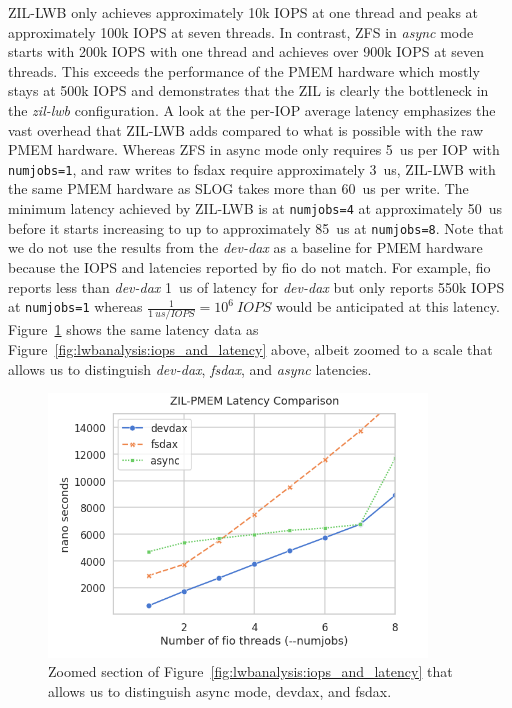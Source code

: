 \documentclass[12pt,a4paper,twoside]{book}
\begin{document}
ZIL-LWB only achieves approximately 10k IOPS at one thread and peaks at approximately 100k IOPS at seven threads.
In contrast, ZFS in \textit{async} mode starts with 200k IOPS with one thread and achieves over 900k IOPS at seven threads.
This exceeds the performance of the PMEM hardware which mostly stays at 500k IOPS and demonstrates that the ZIL is clearly the bottleneck in the \textit{zil-lwb} configuration.
A look at the per-IOP average latency emphasizes the vast overhead that ZIL-LWB adds compared to what is possible with the raw PMEM hardware.
Whereas ZFS in async mode only requires \SI{5}{us} per IOP with \lstinline{numjobs=1}, and raw writes to fsdax require approximately \SI{3}{us}, ZIL-LWB with the same PMEM hardware as SLOG takes more than \SI{60}{us} per write.
The minimum latency achieved by ZIL-LWB is at \lstinline{numjobs=4} at approximately \SI{50}{us} before it starts increasing to up to approximately \SI{85}{us} at \lstinline{numjobs=8}.
Note that we do not use the results from the \textit{dev-dax} as a baseline for PMEM hardware because the IOPS and latencies reported by fio do not match.
For example, fio reports less than \textit{dev-dax} \SI{1}{us} of latency for \textit{dev-dax} but only reports 550k IOPS at \lstinline{numjobs=1} whereas $\frac{1}{\SI{1}{us/IOPS}} = 10^6~\si{IOPS}$ would be anticipated at this latency.
Figure~\ref{fig:lwbanalysis:zoomed_latency} shows the same latency data as Figure~\ref{fig:lwbanalysis:iops_and_latency} above, albeit zoomed to a scale that allows us to distinguish \textit{dev-dax}, \textit{fsdax}, and \textit{async} latencies.

\begin{figure}[H]
    \centering
    \includegraphics[height=7cm]{fig/evaluation/motivating_fio_benchmark__latency_zoomed.png}
    \caption{Zoomed section of Figure~\ref{fig:lwbanalysis:iops_and_latency} that allows us to distinguish async mode, devdax, and fsdax.}
    \label{fig:lwbanalysis:zoomed_latency}
\end{figure}
\end{document}
